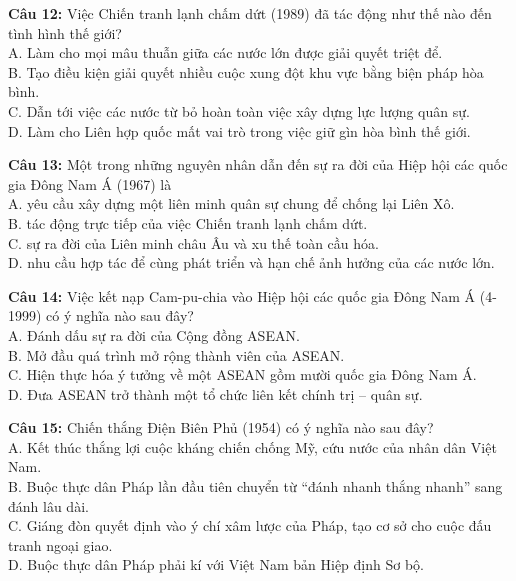 \documentclass[12pt,a4paper]{article}
\begin{document}
\noindent \textbf{Câu 12:} Việc Chiến tranh lạnh chấm dứt (1989) đã tác động như thế nào đến tình hình thế giới?\\
\noindent A. Làm cho mọi mâu thuẫn giữa các nước lớn được giải quyết triệt để.\\
\noindent B. Tạo điều kiện giải quyết nhiều cuộc xung đột khu vực bằng biện pháp hòa bình.\\
\noindent C. Dẫn tới việc các nước từ bỏ hoàn toàn việc xây dựng lực lượng quân sự.\\
\noindent D. Làm cho Liên hợp quốc mất vai trò trong việc giữ gìn hòa bình thế giới.

\noindent \textbf{Câu 13:} Một trong những nguyên nhân dẫn đến sự ra đời của Hiệp hội các quốc gia Đông Nam Á (1967) là\\
\noindent A. yêu cầu xây dựng một liên minh quân sự chung để chống lại Liên Xô.\\
\noindent B. tác động trực tiếp của việc Chiến tranh lạnh chấm dứt.\\
\noindent C. sự ra đời của Liên minh châu Âu và xu thế toàn cầu hóa.\\
\noindent D. nhu cầu hợp tác để cùng phát triển và hạn chế ảnh hưởng của các nước lớn.

\noindent \textbf{Câu 14:} Việc kết nạp Cam-pu-chia vào Hiệp hội các quốc gia Đông Nam Á (4-1999) có ý nghĩa nào sau đây?\\
\noindent A. Đánh dấu sự ra đời của Cộng đồng ASEAN.\\
\noindent B. Mở đầu quá trình mở rộng thành viên của ASEAN.\\
\noindent C. Hiện thực hóa ý tưởng về một ASEAN gồm mười quốc gia Đông Nam Á.\\
\noindent D. Đưa ASEAN trở thành một tổ chức liên kết chính trị -- quân sự.

\noindent \textbf{Câu 15:} Chiến thắng Điện Biên Phủ (1954) có ý nghĩa nào sau đây?\\
\noindent A. Kết thúc thắng lợi cuộc kháng chiến chống Mỹ, cứu nước của nhân dân Việt Nam.\\
\noindent B. Buộc thực dân Pháp lần đầu tiên chuyển từ ``đánh nhanh thắng nhanh'' sang đánh lâu dài.\\
\noindent C. Giáng đòn quyết định vào ý chí xâm lược của Pháp, tạo cơ sở cho cuộc đấu tranh ngoại giao.\\
\noindent D. Buộc thực dân Pháp phải kí với Việt Nam bản Hiệp định Sơ bộ.
\end{document}
